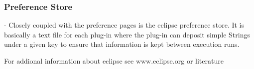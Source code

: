 \subsubsection{Preference Store}
- Closely coupled with the preference pages is the eclipse preference store. It is
basically a text file for each plug-in where the plug-in can deposit simple Strings
under a given key to ensure that information is kept between execution runs.

For addional information about eclipse see www.eclipse.org or literature \cite{eclipsePlugins}